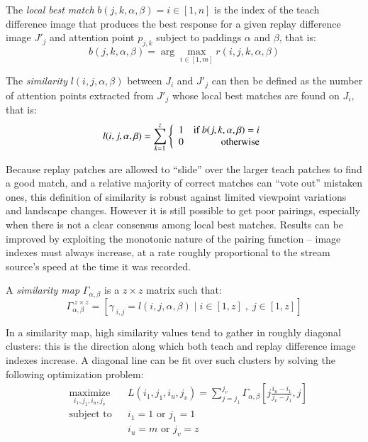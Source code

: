 \documentclass[twocolumn, 9pt,fleqn]{jsproceedings}
\begin{document}
The \textit{local best match} $b(j, k, \alpha, \beta) = i \in [1, n]$ is the index of the teach difference image that produces the best response for a given replay difference image $J'_j$ and attention point $p_{j,k}$ subject to paddings $\alpha$ and $\beta$, that is:
\begin{equation}
b(j, k, \alpha, \beta) = \arg \max_{i \in [1, m]} {r(i, j, k, \alpha, \beta)}
\end{equation}

The \textit{similarity} $l(i, j, \alpha, \beta)$ between $J_i$ and $J'_j$ can then be defined as the number of attention points extracted from $J'_j$ whose local best matches are found on  $J_i$, that is:
\begin{equation}
l(i, j, \alpha, \beta) = \sum_{k = 1}^{z} {
\left\{
\begin{array}{r r}
1 & \text{if } b(j, k, \alpha, \beta) = i \\
0 & \text{otherwise}
\end{array}
\right.
}
\end{equation}

Because replay patches are allowed to ``slide'' over the larger teach patches to find a good match, and a relative majority of correct matches can ``vote out'' mistaken ones, this definition of similarity is robust against limited viewpoint variations and landscape changes. However it is still possible to get poor pairings, especially when there is not a clear consensus among local best matches. Results can be improved by exploiting the monotonic nature of the pairing function -- image indexes must always increase, at a rate roughly proportional to the stream source's speed at the time it was recorded.

A \textit{similarity map} $\Gamma_{\alpha,\beta}$ is a $z \times z$ matrix such that:
\begin{equation}
\Gamma^{\; z \times z}_{\alpha,\beta} = [\gamma_{\; i,j} = l(i, j, \alpha, \beta) \; | \; i \in [1, z] \; , \; j \in [1, z]]
\end{equation}

In a similarity map, high similarity values tend to gather in roughly diagonal clusters: this is the direction along which both teach and replay difference image indexes increase. A diagonal line can be fit over such clusters by solving the following optimization problem:
\begin{equation}
\begin{aligned}
& \underset{i_1, j_1, i_u, j_v}{\text{maximize}}
& & L(i_1, j_1, i_u, j_v) = \sum_{j = j_1}^{j_v}{\Gamma_{\alpha,\beta}[j \frac{i_u - i_1}{j_v - j_1}, j]} \\
& \text{subject to}
& & i_1 = 1 \text{ or } j_1 = 1 \\
&
& & i_u = m \text{ or } j_v = z
\end{aligned}
\end{equation}
\end{document}
